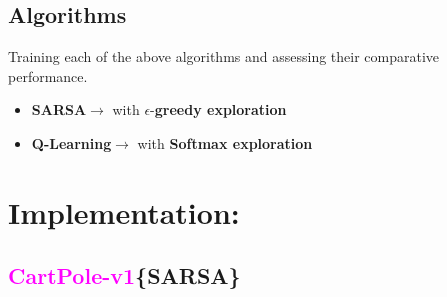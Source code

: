 \documentclass[11pt, a4]{article}
\begin{document}
		\subsection{Algorithms}
		Training each of the above algorithms and assessing their comparative performance.
		\begin{itemize}
			\item \textbf{SARSA}$\rightarrow$ with $\epsilon$-\textbf{greedy exploration}
			\item \textbf{Q-Learning}$\rightarrow$ with \textbf{Softmax exploration}
		\end{itemize}
	\section{Implementation:}
		\subsection{\textcolor{magenta}{CartPole-v1}\{SARSA\}}
	
\end{document}
